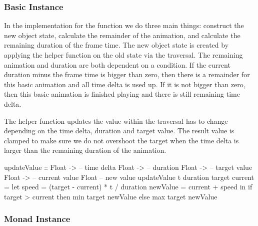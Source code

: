 \subsubsection{Basic Instance}

In the implementation for the  function we do three main things: construct the new object state, calculate the remainder of the animation, and calculate the remaining duration of the frame time. The new object state is created by applying the helper function  on the old state via the traversal. The remaining animation and duration are both dependent on a condition. If the current duration minus the frame time is bigger than zero, then there is a remainder for this basic animation and all time delta is used up. If it is not bigger than zero, then this basic animation is finished playing and there is still remaining time delta.


The  helper function updates the value within the traversal has to change depending on the time delta, duration and target value. The result value is clamped to make sure we do not overshoot the target when the time delta is larger than the remaining duration of the animation.

\begin{code}
updateValue ::
  Float -> -- time delta
  Float -> -- duration
  Float -> -- target value
  Float -> -- current value
  Float -- new value
updateValue t duration target current = let
  speed = (target - current) * t / duration
  newValue = current + speed
  in if target > current
    then min target newValue
    else max target newValue
\end{code}

\subsubsection{Monad Instance}

